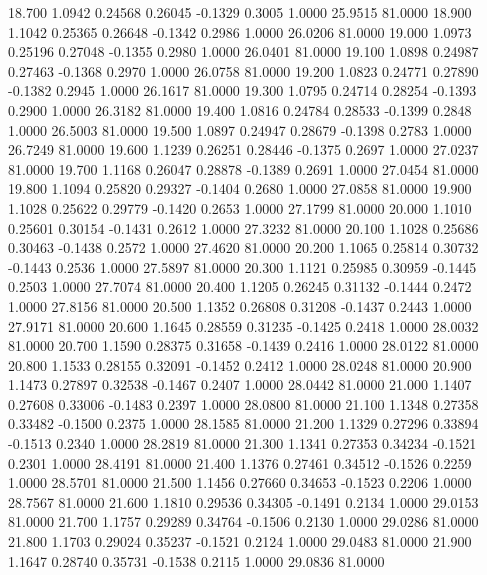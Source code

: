   18.700   1.0942   0.24568   0.26045  -0.1329   0.3005   1.0000  25.9515  81.0000
  18.900   1.1042   0.25365   0.26648  -0.1342   0.2986   1.0000  26.0206  81.0000
  19.000   1.0973   0.25196   0.27048  -0.1355   0.2980   1.0000  26.0401  81.0000
  19.100   1.0898   0.24987   0.27463  -0.1368   0.2970   1.0000  26.0758  81.0000
  19.200   1.0823   0.24771   0.27890  -0.1382   0.2945   1.0000  26.1617  81.0000
  19.300   1.0795   0.24714   0.28254  -0.1393   0.2900   1.0000  26.3182  81.0000
  19.400   1.0816   0.24784   0.28533  -0.1399   0.2848   1.0000  26.5003  81.0000
  19.500   1.0897   0.24947   0.28679  -0.1398   0.2783   1.0000  26.7249  81.0000
  19.600   1.1239   0.26251   0.28446  -0.1375   0.2697   1.0000  27.0237  81.0000
  19.700   1.1168   0.26047   0.28878  -0.1389   0.2691   1.0000  27.0454  81.0000
  19.800   1.1094   0.25820   0.29327  -0.1404   0.2680   1.0000  27.0858  81.0000
  19.900   1.1028   0.25622   0.29779  -0.1420   0.2653   1.0000  27.1799  81.0000
  20.000   1.1010   0.25601   0.30154  -0.1431   0.2612   1.0000  27.3232  81.0000
  20.100   1.1028   0.25686   0.30463  -0.1438   0.2572   1.0000  27.4620  81.0000
  20.200   1.1065   0.25814   0.30732  -0.1443   0.2536   1.0000  27.5897  81.0000
  20.300   1.1121   0.25985   0.30959  -0.1445   0.2503   1.0000  27.7074  81.0000
  20.400   1.1205   0.26245   0.31132  -0.1444   0.2472   1.0000  27.8156  81.0000
  20.500   1.1352   0.26808   0.31208  -0.1437   0.2443   1.0000  27.9171  81.0000
  20.600   1.1645   0.28559   0.31235  -0.1425   0.2418   1.0000  28.0032  81.0000
  20.700   1.1590   0.28375   0.31658  -0.1439   0.2416   1.0000  28.0122  81.0000
  20.800   1.1533   0.28155   0.32091  -0.1452   0.2412   1.0000  28.0248  81.0000
  20.900   1.1473   0.27897   0.32538  -0.1467   0.2407   1.0000  28.0442  81.0000
  21.000   1.1407   0.27608   0.33006  -0.1483   0.2397   1.0000  28.0800  81.0000
  21.100   1.1348   0.27358   0.33482  -0.1500   0.2375   1.0000  28.1585  81.0000
  21.200   1.1329   0.27296   0.33894  -0.1513   0.2340   1.0000  28.2819  81.0000
  21.300   1.1341   0.27353   0.34234  -0.1521   0.2301   1.0000  28.4191  81.0000
  21.400   1.1376   0.27461   0.34512  -0.1526   0.2259   1.0000  28.5701  81.0000
  21.500   1.1456   0.27660   0.34653  -0.1523   0.2206   1.0000  28.7567  81.0000
  21.600   1.1810   0.29536   0.34305  -0.1491   0.2134   1.0000  29.0153  81.0000
  21.700   1.1757   0.29289   0.34764  -0.1506   0.2130   1.0000  29.0286  81.0000
  21.800   1.1703   0.29024   0.35237  -0.1521   0.2124   1.0000  29.0483  81.0000
  21.900   1.1647   0.28740   0.35731  -0.1538   0.2115   1.0000  29.0836  81.0000
